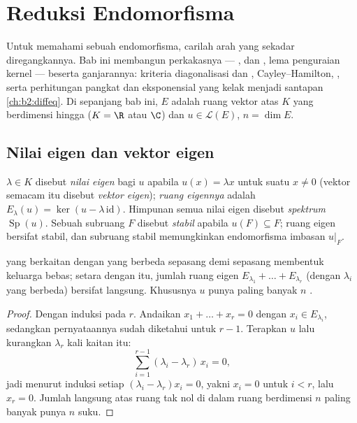 \chapter{Reduksi Endomorfisma}\label{ch:b2:reduction}

Untuk memahami sebuah endomorfisma, carilah arah yang sekadar
diregangkannya. Bab ini membangun perkakasnya --- ,
 dan , lema penguraian
kernel --- beserta ganjarannya: kriteria diagonalisasi dan
, Cayley--Hamilton, , serta
perhitungan pangkat dan eksponensial yang kelak menjadi santapan
\cref{ch:b2:diffeq}. Di sepanjang bab ini, $E$ adalah ruang vektor
atas $K$ yang berdimensi hingga ($K = \R$ atau $\C$) dan $u \in
\mathcal{L}(E)$, $n = \dim E$.

\section{Nilai eigen dan vektor eigen}

\begin{definition}\label{def:b2:reduction:eigen}
$\lambda \in K$ disebut \emph{nilai eigen} bagi $u$
apabila $u(x) = \lambda x$ untuk suatu $x \neq 0$ (vektor semacam itu
disebut \emph{vektor eigen}); \emph{ruang eigennya} adalah $E_\lambda(u) =
\ker(u - \lambda\,\mathrm{id})$. Himpunan semua nilai eigen disebut
\emph{spektrum} $\operatorname{Sp}(u)$. Sebuah subruang $F$
disebut \emph{stabil} apabila $u(F) \subseteq F$; ruang eigen bersifat
stabil, dan subruang stabil memungkinkan endomorfisma imbasan $u|_F$.
\end{definition}

\begin{theorem}\label{thm:b2:reduction:independence}
 yang berkaitan dengan  yang berbeda sepasang
demi sepasang membentuk keluarga bebas; setara dengan itu, jumlah ruang
eigen $E_{\lambda_1} + \dots + E_{\lambda_r}$ (dengan $\lambda_i$ yang
berbeda) bersifat langsung. Khususnya $u$ punya paling banyak $n$ .
\end{theorem}

\begin{proof}
Dengan induksi pada $r$. Andaikan $x_1 + \dots + x_r = 0$ dengan $x_i \in
E_{\lambda_i}$, sedangkan pernyataannya sudah diketahui untuk $r - 1$.
Terapkan $u$ lalu kurangkan $\lambda_r$ kali kaitan itu:
\[
\sum_{i=1}^{r-1} (\lambda_i - \lambda_r)\, x_i = 0 ,
\]
jadi menurut induksi setiap $(\lambda_i - \lambda_r)x_i = 0$, yakni $x_i =
0$ untuk $i < r$, lalu $x_r = 0$. Jumlah langsung atas ruang tak nol di
dalam ruang berdimensi $n$ paling banyak punya $n$ suku.
\end{proof}

